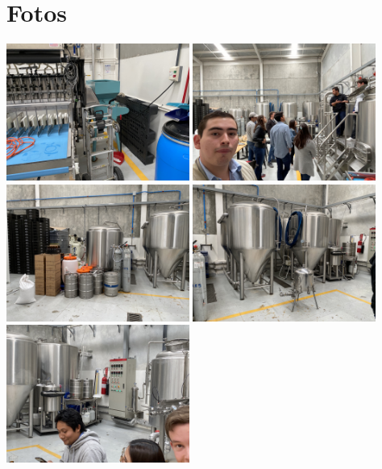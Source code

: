 \documentclass{article}
\begin{document}
\section{Fotos}
\noindent
\includegraphics[width=6cm]{./img/01.JPG}
\includegraphics[width=6cm]{./img/02.JPG}
\includegraphics[width=6cm]{./img/03.JPG}
\includegraphics[width=6cm]{./img/04.JPG}
\includegraphics[width=6cm]{./img/05.JPG}
\end{document}
